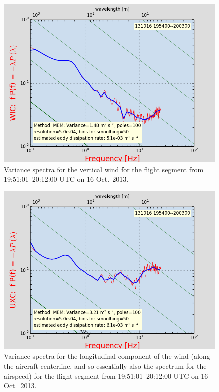 \documentclass[12pt,twoside,english]{article}\usepackage[]{graphicx}\usepackage[]{color}
\let\OrgIndex\index
\renewcommand*{\index}[1]{\OrgIndex{#1}}
\begin{document}

\begin{figure}
\noindent \begin{centering}
\includegraphics[height=0.4\textheight]{SpecialGraphics/PSD1.png}  
\par\end{centering}

\protect\protect\protect\caption{\label{fig:AppxB-PSD1}Variance spectra for the vertical wind for the flight segment from 19:51:01--20:12:00 UTC on 16 Oct.\ 2013.} 
\end{figure}
\begin{figure}
\noindent \begin{centering}
\includegraphics[height=0.4\textheight]{SpecialGraphics/PSD2.png}  
\par\end{centering}

\protect\caption{\label{fig:AppxB-PSD2}Variance spectra for the longitudinal component of the wind (along the aircraft centerline, and so essentially also the spectrum for the airspeed) for the flight segment from 19:51:01--20:12:00 UTC on 16 Oct.\ 2013.} 
\end{figure}
\end{document}
